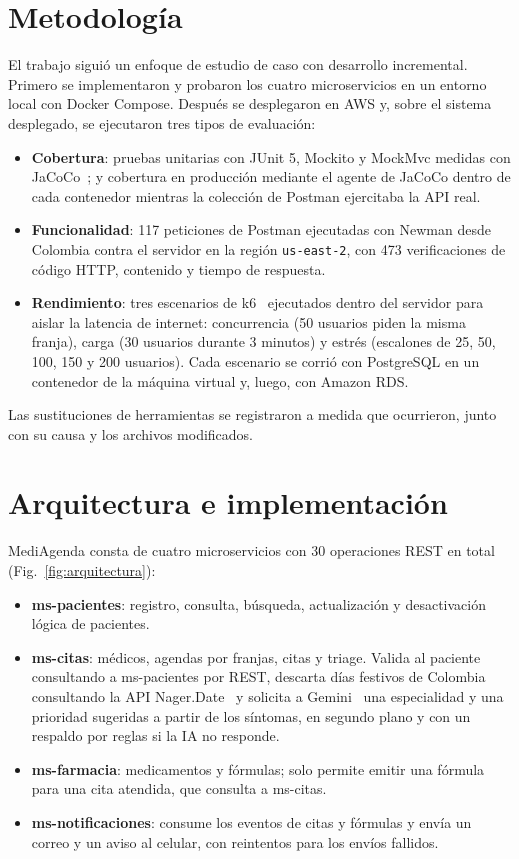 \documentclass[conference]{IEEEtran}
\begin{document}
\section{Metodología}
El trabajo siguió un enfoque de estudio de caso con desarrollo incremental. Primero se implementaron y probaron los cuatro microservicios en un entorno local con Docker Compose. Después se desplegaron en AWS y, sobre el sistema desplegado, se ejecutaron tres tipos de evaluación:
\begin{itemize}
\item \textbf{Cobertura}: pruebas unitarias con JUnit 5, Mockito y MockMvc medidas con JaCoCo~\cite{jacoco}; y cobertura en producción mediante el agente de JaCoCo dentro de cada contenedor mientras la colección de Postman ejercitaba la API real.
\item \textbf{Funcionalidad}: 117 peticiones de Postman ejecutadas con Newman desde Colombia contra el servidor en la región \texttt{us-east-2}, con 473 verificaciones de código HTTP, contenido y tiempo de respuesta.
\item \textbf{Rendimiento}: tres escenarios de k6~\cite{k6} ejecutados dentro del servidor para aislar la latencia de internet: concurrencia (50 usuarios piden la misma franja), carga (30 usuarios durante 3 minutos) y estrés (escalones de 25, 50, 100, 150 y 200 usuarios). Cada escenario se corrió con PostgreSQL en un contenedor de la máquina virtual y, luego, con Amazon RDS.
\end{itemize}
Las sustituciones de herramientas se registraron a medida que ocurrieron, junto con su causa y los archivos modificados.

\section{Arquitectura e implementación}
MediAgenda consta de cuatro microservicios con 30 operaciones REST en total (Fig.~\ref{fig:arquitectura}):
\begin{itemize}
\item \textbf{ms-pacientes}: registro, consulta, búsqueda, actualización y desactivación lógica de pacientes.
\item \textbf{ms-citas}: médicos, agendas por franjas, citas y triage. Valida al paciente consultando a ms-pacientes por REST, descarta días festivos de Colombia consultando la API Nager.Date~\cite{nager} y solicita a Gemini~\cite{gemini} una especialidad y una prioridad sugeridas a partir de los síntomas, en segundo plano y con un respaldo por reglas si la IA no responde.
\item \textbf{ms-farmacia}: medicamentos y fórmulas; solo permite emitir una fórmula para una cita atendida, que consulta a ms-citas.
\item \textbf{ms-notificaciones}: consume los eventos de citas y fórmulas y envía un correo y un aviso al celular, con reintentos para los envíos fallidos.
\end{itemize}
\end{document}
